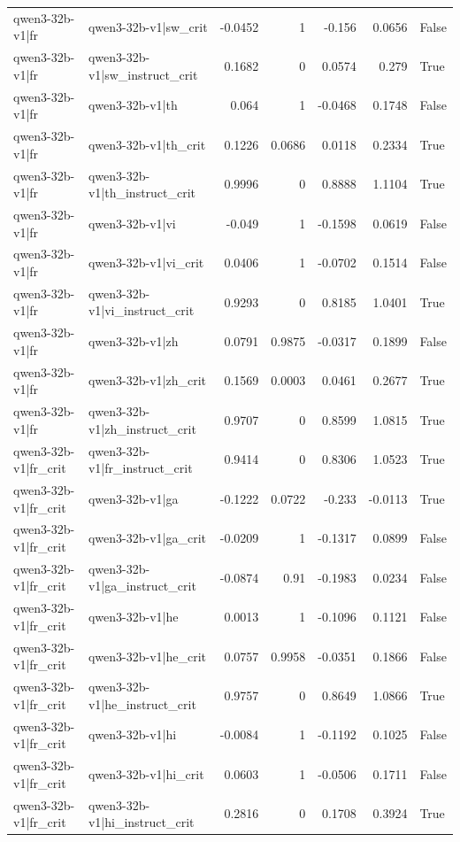 \begin{table}
\begin{tabular}{l l r r r r l}
qwen3-32b-v1|fr & qwen3-32b-v1|sw_crit & -0.0452 & 1 & -0.156 & 0.0656 & False \\
qwen3-32b-v1|fr & qwen3-32b-v1|sw_instruct_crit & 0.1682 & 0 & 0.0574 & 0.279 & True \\
qwen3-32b-v1|fr & qwen3-32b-v1|th & 0.064 & 1 & -0.0468 & 0.1748 & False \\
qwen3-32b-v1|fr & qwen3-32b-v1|th_crit & 0.1226 & 0.0686 & 0.0118 & 0.2334 & True \\
qwen3-32b-v1|fr & qwen3-32b-v1|th_instruct_crit & 0.9996 & 0 & 0.8888 & 1.1104 & True \\
qwen3-32b-v1|fr & qwen3-32b-v1|vi & -0.049 & 1 & -0.1598 & 0.0619 & False \\
qwen3-32b-v1|fr & qwen3-32b-v1|vi_crit & 0.0406 & 1 & -0.0702 & 0.1514 & False \\
qwen3-32b-v1|fr & qwen3-32b-v1|vi_instruct_crit & 0.9293 & 0 & 0.8185 & 1.0401 & True \\
qwen3-32b-v1|fr & qwen3-32b-v1|zh & 0.0791 & 0.9875 & -0.0317 & 0.1899 & False \\
qwen3-32b-v1|fr & qwen3-32b-v1|zh_crit & 0.1569 & 0.0003 & 0.0461 & 0.2677 & True \\
qwen3-32b-v1|fr & qwen3-32b-v1|zh_instruct_crit & 0.9707 & 0 & 0.8599 & 1.0815 & True \\
qwen3-32b-v1|fr_crit & qwen3-32b-v1|fr_instruct_crit & 0.9414 & 0 & 0.8306 & 1.0523 & True \\
qwen3-32b-v1|fr_crit & qwen3-32b-v1|ga & -0.1222 & 0.0722 & -0.233 & -0.0113 & True \\
qwen3-32b-v1|fr_crit & qwen3-32b-v1|ga_crit & -0.0209 & 1 & -0.1317 & 0.0899 & False \\
qwen3-32b-v1|fr_crit & qwen3-32b-v1|ga_instruct_crit & -0.0874 & 0.91 & -0.1983 & 0.0234 & False \\
qwen3-32b-v1|fr_crit & qwen3-32b-v1|he & 0.0013 & 1 & -0.1096 & 0.1121 & False \\
qwen3-32b-v1|fr_crit & qwen3-32b-v1|he_crit & 0.0757 & 0.9958 & -0.0351 & 0.1866 & False \\
qwen3-32b-v1|fr_crit & qwen3-32b-v1|he_instruct_crit & 0.9757 & 0 & 0.8649 & 1.0866 & True \\
qwen3-32b-v1|fr_crit & qwen3-32b-v1|hi & -0.0084 & 1 & -0.1192 & 0.1025 & False \\
qwen3-32b-v1|fr_crit & qwen3-32b-v1|hi_crit & 0.0603 & 1 & -0.0506 & 0.1711 & False \\
qwen3-32b-v1|fr_crit & qwen3-32b-v1|hi_instruct_crit & 0.2816 & 0 & 0.1708 & 0.3924 & True \\

\end{tabular}
\end{table}
